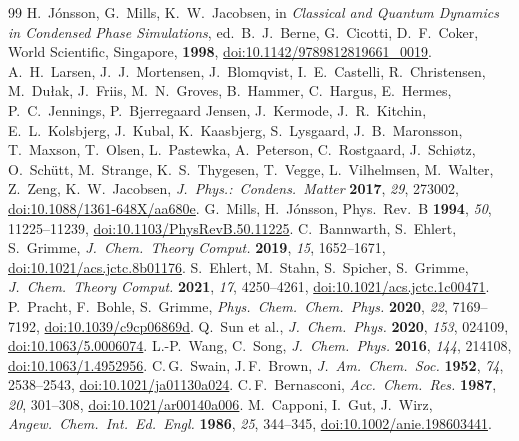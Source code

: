 \documentclass[11pt,a4paper]{article}
\begin{document}
\begin{thebibliography}{99}
 H.\ J\'onsson, G.\ Mills, K.\ W.\ Jacobsen, in \textit{Classical and Quantum Dynamics in Condensed Phase Simulations}, ed.\ B.\ J.\ Berne, G.\ Cicotti, D.\ F.\ Coker, World Scientific, Singapore, \textbf{1998}, \href{https://doi.org/10.1142/9789812819661_0019}{doi:10.1142/9789812819661\_0019}.
 A.\ H.\ Larsen, J.\ J.\ Mortensen, J.\ Blomqvist, I.\ E.\ Castelli, R.\ Christensen, M.\ Du\l{}ak, J.\ Friis, M.\ N.\ Groves, B.\ Hammer, C.\ Hargus, E.\ Hermes, P.\ C.\ Jennings, P.\ Bjerregaard Jensen, J.\ Kermode, J.\ R.\ Kitchin, E.\ L.\ Kolsbjerg, J.\ Kubal, K.\ Kaasbjerg, S.\ Lysgaard, J.\ B.\ Maronsson, T.\ Maxson, T.\ Olsen, L.\ Pastewka, A.\ Peterson, C.\ Rostgaard, J.\ Schi\o{}tz, O.\ Sch\"utt, M.\ Strange, K.\ S.\ Thygesen, T.\ Vegge, L.\ Vilhelmsen, M.\ Walter, Z.\ Zeng, K.\ W.\ Jacobsen, \textit{J.\ Phys.:\ Condens.\ Matter} \textbf{2017}, \textit{29}, 273002, \href{https://doi.org/10.1088/1361-648X/aa680e}{doi:10.1088/1361-648X/aa680e}.
 G.\ Mills, H.\ J\'onsson, Phys.\ Rev.\ B \textbf{1994}, \textit{50}, 11225--11239, \href{https://doi.org/10.1103/PhysRevB.50.11225}{doi:10.1103/PhysRevB.50.11225}.
 C.\ Bannwarth, S.\ Ehlert, S.\ Grimme, \textit{J.\ Chem.\ Theory Comput.} \textbf{2019}, \textit{15}, 1652--1671, \href{https://doi.org/10.1021/acs.jctc.8b01176}{doi:10.1021/acs.jctc.8b01176}.
 S.\ Ehlert, M.\ Stahn, S.\ Spicher, S.\ Grimme, \textit{J.\ Chem.\ Theory Comput.} \textbf{2021}, \textit{17}, 4250--4261, \href{https://doi.org/10.1021/acs.jctc.1c00471}{doi:10.1021/acs.jctc.1c00471}.
 P.\ Pracht, F.\ Bohle, S.\ Grimme, \textit{Phys.\ Chem.\ Chem.\ Phys.} \textbf{2020}, \textit{22}, 7169--7192, \href{https://doi.org/10.1039/c9cp06869d}{doi:10.1039/c9cp06869d}.
 Q.\ Sun et al., \textit{J.\ Chem.\ Phys.} \textbf{2020}, \textit{153}, 024109, \href{https://doi.org/10.1063/5.0006074}{doi:10.1063/5.0006074}.
 L.-P.\ Wang, C.\ Song, \textit{J.\ Chem.\ Phys.} \textbf{2016}, \textit{144}, 214108, \href{https://doi.org/10.1063/1.4952956}{doi:10.1063/1.4952956}.
 C.\,G.\ Swain, J.\,F.\ Brown, \textit{J.\ Am.\ Chem.\ Soc.} \textbf{1952}, \textit{74}, 2538--2543, \href{https://doi.org/10.1021/ja01130a024}{doi:10.1021/ja01130a024}.
 C.\,F.\ Bernasconi, \textit{Acc.\ Chem.\ Res.} \textbf{1987}, \textit{20}, 301--308, \href{https://doi.org/10.1021/ar00140a006}{doi:10.1021/ar00140a006}.
 M.\ Capponi, I.\ Gut, J.\ Wirz, \textit{Angew.\ Chem.\ Int.\ Ed.\ Engl.} \textbf{1986}, \textit{25}, 344--345, \href{https://doi.org/10.1002/anie.198603441}{doi:10.1002/anie.198603441}.

\end{thebibliography}
\end{document}
